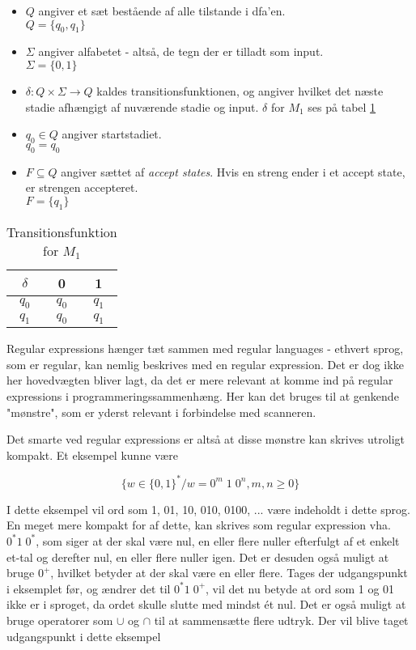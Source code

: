 \begin{itemize}
    \item $Q$ angiver et sæt bestående af alle tilstande i \gls{dfa}'en.\\
        $Q = \{q_0, q_1\}$
    \item $\Sigma$ angiver alfabetet - altså, de tegn der er tilladt som input.\\
        $\Sigma = \{0, 1\}$
    \item $\delta: Q \times \Sigma \rightarrow Q$ kaldes transitionsfunktionen, og angiver hvilket det næste stadie afhængigt af nuværende stadie og input. $\delta$ for $M_1$ ses på tabel \ref{tab:transfunk_m1}
    \item $q_0 \in Q$ angiver startstadiet.\\
        $q_0 = q_0$
    \item $F \subseteq Q$ angiver sættet af \textit{accept states}. Hvis en streng ender i et accept state, er strengen accepteret.\\
        $F = \{q_1\}$
\end{itemize}

\begin{table}[H]
    \centering
        \begin{tabular}{ c|c c }
        \centering
            $\delta$ & 0 & 1\\ \hline 
            $q_0$ & $q_0$ & $q_1$\\
            $q_1$ & $q_0$ & $q_1$\\
        \end{tabular}
    \caption{Transitionsfunktion for $M_1$}
    \label{tab:transfunk_m1}
\end{table}

Regular expressions hænger tæt sammen med regular languages - ethvert sprog, som er regular, kan nemlig beskrives med en regular expression. Det er dog ikke her hovedvægten bliver lagt, da det er mere relevant at komme ind på regular expressions i programmeringssammenhæng. Her kan det bruges til at genkende "mønstre"\mbox{}, som er yderst relevant i forbindelse med scanneren. 

Det smarte ved regular expressions er altså at disse mønstre kan skrives utroligt kompakt. Et eksempel kunne være 

$$ \{w \in \{0, 1\}^* / w = 0^m\; 1\; 0^n, m,n \geq 0\} $$

\noindent I dette eksempel vil ord som 1, 01, 10, 010, 0100, ... være indeholdt i dette sprog. En meget mere kompakt for af dette, kan skrives som regular expression vha. $ 0^* 1\; 0^* $, som siger at der skal være nul, en eller flere nuller efterfulgt af et enkelt et-tal og derefter nul, en eller flere nuller igen. Det er desuden også muligt at bruge $0^+$, hvilket betyder at der skal være en eller flere. Tages der udgangspunkt i eksemplet før, og ændrer det til $0^* 1\; 0^+$, vil det nu betyde at ord som 1 og 01 ikke er i sproget, da ordet skulle slutte med mindst ét nul. Det er også muligt at bruge operatorer som $\cup$ og $\cap$ til at sammensætte flere udtryk. Der vil blive taget udgangspunkt i dette eksempel

